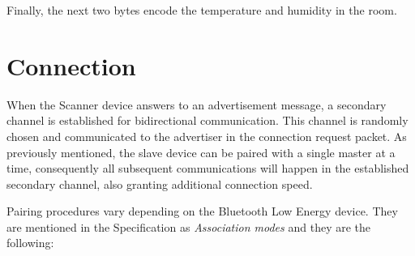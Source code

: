 Finally, the next two bytes encode the temperature and humidity in the room.
\fi
\section{Connection}
When the Scanner device answers to an advertisement message, a secondary channel is established for bidirectional communication. This channel is randomly chosen and communicated to the advertiser in the connection request packet. As previously mentioned, the slave device can be paired with a single master at a time, consequently all subsequent communications will happen in the established secondary channel, also granting additional connection speed.

Pairing procedures vary depending on the Bluetooth Low Energy device. They are mentioned in the Specification as \textit{Association modes} and they are the following:
